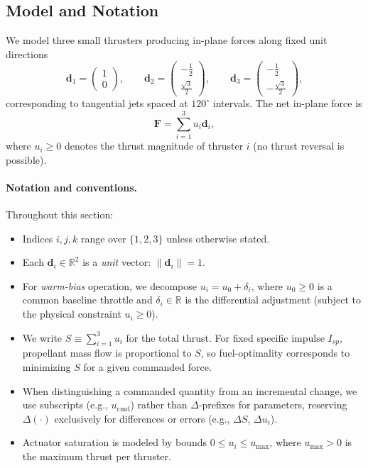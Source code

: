 \documentclass{article}
\begin{document}
\subsection{Model and Notation}

We model three small thrusters producing in-plane forces along fixed unit directions
\begin{equation}
\mathbf d_1 = \begin{pmatrix}1\\0\end{pmatrix}, \qquad
\mathbf d_2 = \begin{pmatrix}-\tfrac{1}{2}\\ \tfrac{\sqrt{3}}{2}\end{pmatrix}, \qquad
\mathbf d_3 = \begin{pmatrix}-\tfrac{1}{2}\\ -\tfrac{\sqrt{3}}{2}\end{pmatrix},
\end{equation}
corresponding to tangential jets spaced at $120^\circ$ intervals. The net in-plane force is
\begin{equation}
\mathbf F = \sum_{i=1}^{3} u_i \mathbf d_i,
\end{equation}
where $u_i \ge 0$ denotes the thrust magnitude of thruster $i$ (no thrust reversal is possible).

\paragraph{Notation and conventions.}
Throughout this section:
\begin{itemize}
\item Indices $i, j, k$ range over $\{1, 2, 3\}$ unless otherwise stated.
\item Each $\mathbf d_i \in \mathbb{R}^2$ is a \emph{unit} vector: $\|\mathbf d_i\| = 1$.
\item For \emph{warm-bias} operation, we decompose $u_i = u_0 + \delta_i$, where $u_0 \ge 0$ is a 
      common baseline throttle and $\delta_i \in \mathbb{R}$ is the differential adjustment 
      (subject to the physical constraint $u_i \ge 0$).
\item We write $S \equiv \sum_{i=1}^{3} u_i$ for the total thrust. For fixed specific impulse $I_{sp}$, 
      propellant mass flow is proportional to $S$, so fuel-optimality corresponds to minimizing $S$ 
      for a given commanded force.
\item When distinguishing a commanded quantity from an incremental change, we use subscripts 
      (e.g., $u_{\mathrm{cmd}}$) rather than $\Delta$-prefixes for parameters, reserving 
      $\Delta(\cdot)$ exclusively for differences or errors (e.g., $\Delta S$, $\Delta u_i$).
\item Actuator saturation is modeled by bounds $0 \le u_i \le u_{\max}$, where $u_{\max} > 0$ 
      is the maximum thrust per thruster.
\end{itemize}
\end{document}
